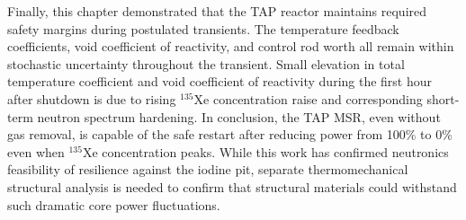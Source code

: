 Finally, this chapter demonstrated that the \gls{TAP} reactor maintains 
required safety margins during postulated transients. The temperature feedback 
coefficients, void coefficient of reactivity, and control rod worth all remain 
within stochastic uncertainty throughout the transient. Small elevation in 
total temperature coefficient and void coefficient of reactivity during the 
first hour after shutdown is due to rising $^{135}$Xe concentration raise and 
corresponding short-term neutron spectrum hardening. In conclusion, the 
\gls{TAP} \gls{MSR}, even without gas removal, is capable of the safe restart 
after reducing power from 100\% to 0\% even when $^{135}$Xe concentration 
peaks. 
While this work has confirmed neutronics feasibility of resilience against the 
iodine pit, separate thermomechanical structural analysis is needed to confirm 
that structural materials could withstand such dramatic core power 
fluctuations.





